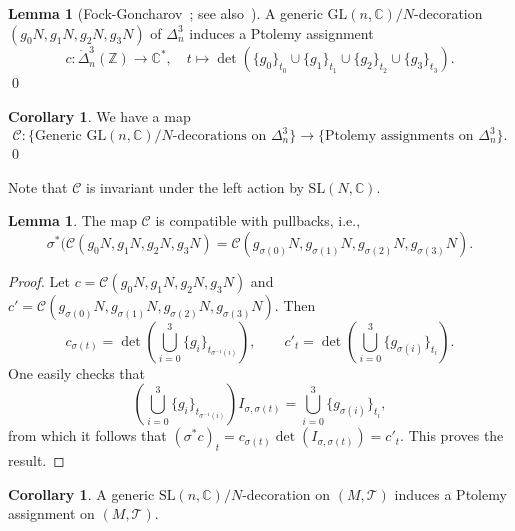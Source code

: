 \documentclass[12pt]{amsart}
\theoremstyle{definition}
\newtheorem{lemma}[theorem]{Lemma}
\newtheorem{corollary}[theorem]{Corollary}
\numberwithin{equation}{section}
\def\SL{\mathrm{SL}}
\def\GL{\mathrm{GL}}
\def\Z{\mathbb{Z}}
\def\C{\mathbb{C}}
\begin{document}
\begin{lemma}[{Fock-Goncharov~\cite[Lemma~10.3]{FockGoncharov}; see also~\cite{GaroufalidisThurstonZickert}}]\label{lemma:DecorationToPtolemy}
A generic $\GL(n,\C)/N$-decoration $(g_0N,g_1N,g_2N,g_3N)$ of $\Delta^3_n$ induces a Ptolemy assignment
\begin{equation}\label{eqn:DecoToPtolemy}
c\colon\dot\Delta_n^3(\Z)\to \C^*,\quad t\mapsto \det\left(\{g_0\}_{t_0}\cup\{g_1\}_{t_1}\cup\{g_2\}_{t_2}\cup\{g_3\}_{t_3}\right).
\end{equation}\qed
\end{lemma}
\begin{corollary} We have a map
\begin{equation}
\mathcal C\colon\text{\{Generic $\GL(n,\C)/N$-decorations on $\Delta^3_n$\}}\to \text{\{Ptolemy assignments on $\Delta^3_n$\}}. 
\end{equation}\qed
\end{corollary}
Note that $\mathcal C$ is invariant under the left action by $\SL(N,\C)$.

\begin{lemma} \label{lemma:DecorationsAndPullbacks}
The map $\mathcal C$ is compatible with pullbacks, i.e., 
\begin{equation}\label{eq:DecorationsAndPullbacks}
\sigma^*(\mathcal C(g_0N,g_1N,g_2N,g_3N)=\mathcal C(g_{\sigma(0)}N,g_{\sigma(1)}N,g_{\sigma(2)}N,g_{\sigma(3)}N).
\end{equation}
\end{lemma}
\begin{proof}
Let $c=\mathcal C(g_0N,g_1N,g_2N,g_3N)$ and $c'=\mathcal C(g_{\sigma(0)}N,g_{\sigma(1)}N,g_{\sigma(2)}N,g_{\sigma(3)}N)$. Then
\begin{equation}
c_{\sigma(t)}=\det\left(\bigcup_{i=0}^3\{g_i\}_{t_{\sigma^{-1}(i)}}\right),\qquad c'_t=\det\left(\bigcup_{i=0}^3\{g_{\sigma(i)}\}_{t_i}\right).
\end{equation}
One easily checks that
\begin{equation}
\left(\bigcup_{i=0}^3\{g_i\}_{t_{\sigma^{-1}(i)}}\right)I_{\sigma,\sigma(t)}=\bigcup_{i=0}^3\{g_{\sigma(i)}\}_{t_i},
\end{equation}
from which it follows that $(\sigma^*c)_t=c_{\sigma(t)}\det(I_{\sigma,\sigma(t)})=c'_t$. This proves the result.
\end{proof}
\begin{corollary}
A generic $\SL(n,\C)/N$-decoration on $(M,\mathcal{T})$ induces a Ptolemy assignment on $(M,\mathcal{T})$.
\end{corollary}
\end{document}
